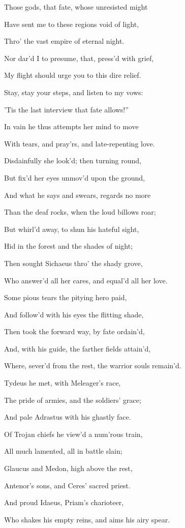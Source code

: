 Those gods, that fate, whose unresisted might

Have sent me to these regions void of light,

Thro’ the vast empire of eternal night.

Nor dar’d I to presume, that, press’d with grief,

My flight should urge you to this dire relief.

Stay, stay your steps, and listen to my vows:

’Tis the last interview that fate allows!”

In vain he thus attempts her mind to move

With tears, and pray’rs, and late-repenting love.

Disdainfully she look’d; then turning round,

But fix’d her eyes unmov’d upon the ground,

And what he says and swears, regards no more

Than the deaf rocks, when the loud billows roar;

But whirl’d away, to shun his hateful sight,

Hid in the forest and the shades of night;

Then sought Sichaeus thro’ the shady grove,

Who answer’d all her cares, and equal’d all her love.

Some pious tears the pitying hero paid,

And follow’d with his eyes the flitting shade,

Then took the forward way, by fate ordain’d,

And, with his guide, the farther fields attain’d,

Where, sever’d from the rest, the warrior souls remain’d.

Tydeus he met, with Meleager’s race,

The pride of armies, and the soldiers’ grace;

And pale Adrastus with his ghastly face.

Of Trojan chiefs he view’d a num’rous train,

All much lamented, all in battle slain;

Glaucus and Medon, high above the rest,

Antenor’s sons, and Ceres’ sacred priest.

And proud Idaeus, Priam’s charioteer,

Who shakes his empty reins, and aims his airy spear.

